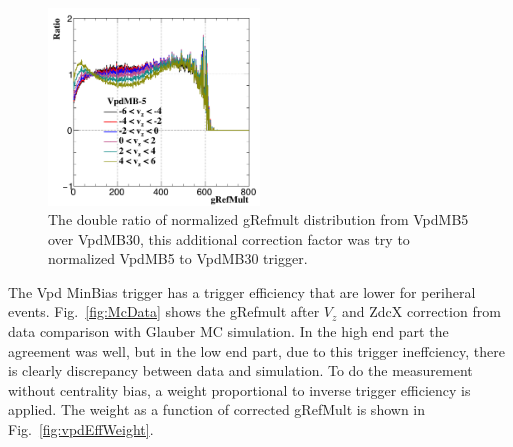 \documentclass[a4paper]{article}
\begin{document}
\begin{figure}[htbp]
\centering
\includegraphics[keepaspectratio,width=0.5\textwidth]{fig/MB5_VzScale.png}
\caption{The double ratio of normalized gRefmult distribution from VpdMB5 over VpdMB30, this additional correction factor was try to normalized VpdMB5 to VpdMB30 trigger.}
 \label{fig:MB5_vzscale}
\end{figure}

The Vpd MinBias trigger has a trigger efficiency that are lower for periheral events. Fig.~\ref{fig:McData} shows the gRefmult after $V_{z}$ and ZdcX correction from data comparison with Glauber MC simulation. In the high end part the agreement was well, but in the low end part, due to this trigger ineffciency, there is clearly discrepancy between data and simulation. To do the measurement without centrality bias, a weight proportional to inverse trigger efficiency is applied. The weight as a function of corrected gRefMult is shown in Fig.~\ref{fig:vpdEffWeight}.
\end{document}

